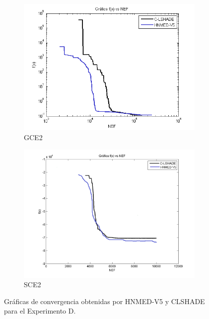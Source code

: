 \begin{figure}
\begin{subfigure}[b]{0.49\linewidth}
		\includegraphics[width=\linewidth]{Figures/E-Grafica_Convergencia_Problema_5}
		\caption{GCE2} \label{fig:G2} 
	\end{subfigure}
	\begin{subfigure}[b]{0.49\linewidth}
		\includegraphics[width=\linewidth]{Figures/E-Grafica_Convergencia_Problema_6}
		\caption{SCE2} \label{fig:S1} 
	\end{subfigure}
	\caption{Gráficas de convergencia obtenidas por HNMED-V5 y CLSHADE para el Experimento D.} \label{fig: Gráficas de convergencia obtenidas por HNMED-V5 y CLSHADE para el Experimento D} 
	
\end{figure}

